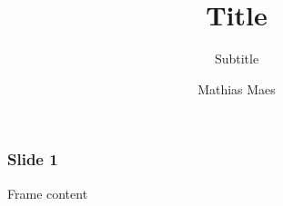 \documentclass[compress]{beamer}
\title{Title}
\subtitle{Subtitle}
\author{Mathias Maes}
\begin{document}
\maketitle

\begin{frame}

    \frametitle{Slide 1}

    Frame content

\end{frame}
\end{document}
